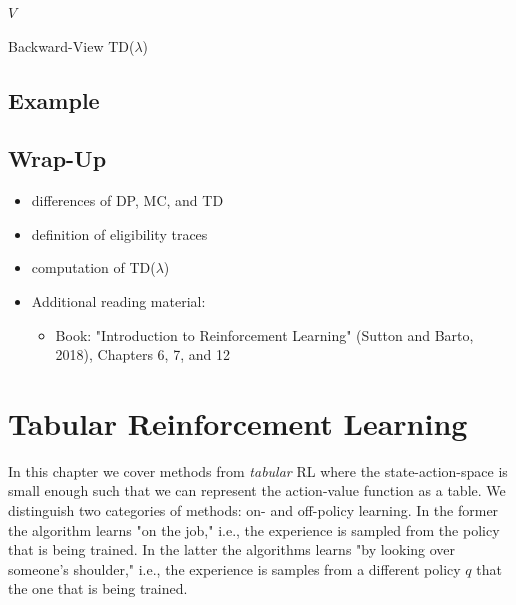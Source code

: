 			\begin{algorithm}  \DontPrintSemicolon
				\Return \(V\) \;
				\caption{Backward-View TD(\(\lambda\))}
				\label{alg:backwardViewTdLambda}
			\end{algorithm}

	\section{Example}

	\section{Wrap-Up}
		\begin{itemize}
			\item differences of \ac{DP}, \ac{MC}, and \ac{TD}
			\item definition of eligibility traces
			\item computation of TD(\(\lambda\))
			\item Additional reading material:
				\begin{itemize}
					\item Book: "Introduction to Reinforcement Learning" (Sutton and Barto, 2018), Chapters 6, 7, and 12  %
				\end{itemize}
		\end{itemize}

\chapter{Tabular Reinforcement Learning}
	In this chapter we cover methods from \emph{tabular} \ac{RL} where the state-action-space is small enough such that we can represent the action-value function as a table. We distinguish two categories of methods: on- and off-policy learning. In the former the algorithm learns "on the job," i.e., the experience is sampled from the policy that is being trained. In the latter the algorithms learns "by looking over someone's shoulder," i.e., the experience is samples from a different policy \(q\) that the one that is being trained.


